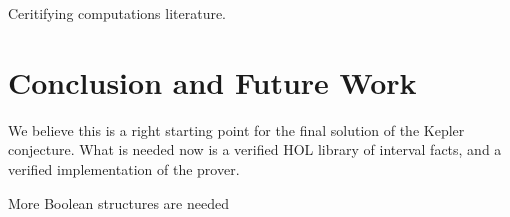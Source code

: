 \documentclass[envcountsect]{llncs}
\begin{document}
Ceritifying computations literature. 



\section{Conclusion and Future Work}

We believe this is a right starting point for the final solution of the Kepler
conjecture. What is needed now is a verified HOL library of interval facts, and
a verified implementation of the prover. 

More Boolean structures are needed 



\end{document}
